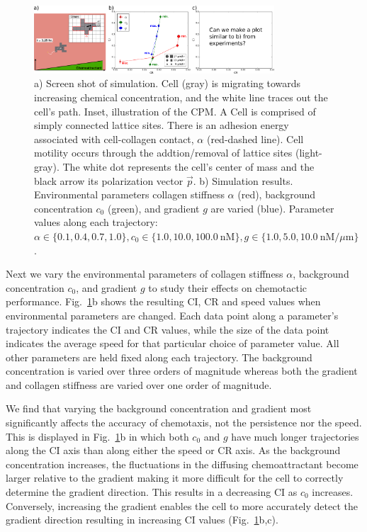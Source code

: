 \begin{figure}[t]
    \centering
    \includegraphics[width=0.80\textwidth]{../fig/ch2_fig3.png}
    \caption{a) Screen shot of simulation. Cell (gray) is migrating towards increasing chemical concentration, and the white line traces out the cell's path. Inset, illustration of the CPM. A Cell is comprised of simply connected lattice sites. There is an adhesion energy associated with cell-collagen contact, $\alpha$ (red-dashed line). Cell motility occurs through the addtion/removal of lattice sites (light-gray). The white dot represents the cell's center of mass and the black arrow its polarization vector $\vec{p}$. b) Simulation results. Environmental parameters collagen stiffness $\alpha$ (red), background concentration $c_0$ (green), and gradient $g$ are varied (blue).
    Parameter values along each trajectory: $\alpha \in \{ 0.1, 0.4, 0.7, 1.0 \}, c_0 \in \{ 1.0, 10.0, 100.0 \ \text{nM} \}, g \in \{ 1.0, 5.0, 10.0 \ \text{nM}/\mu\text{m} \}$.}
    \label{fig:ch2_3}
\end{figure}

Next we vary the environmental parameters of collagen stiffness $\alpha$, background concentration $c_0$, and gradient $g$ to study their effects on chemotactic performance. Fig.\ \ref{fig:ch2_3}b shows the resulting CI, CR and speed values when environmental parameters are changed. Each data point along a parameter's trajectory indicates the CI and CR values, while the size of the data point indicates the average speed for that particular choice of parameter value. All other parameters are held fixed along each trajectory. The background concentration is varied over three orders of magnitude whereas both the gradient and collagen stiffness are varied over one order of magnitude.

We find that varying the background concentration and gradient most significantly affects the accuracy of chemotaxis, not the persistence nor the speed. This is displayed in Fig.\ \ref{fig:ch2_3}b in which both $c_0$ and $g$ have much longer trajectories along the CI axis than along either the speed or CR axis.
As the background concentration increases, the fluctuations in the diffusing chemoattractant become larger relative to the gradient making it more difficult for the cell to correctly determine the gradient direction. This results in a decreasing CI as $c_0$ increases. Conversely, increasing the gradient enables the cell to more accurately detect the gradient direction resulting in increasing CI values (Fig.\ \ref{fig:ch2_3}b,c).

